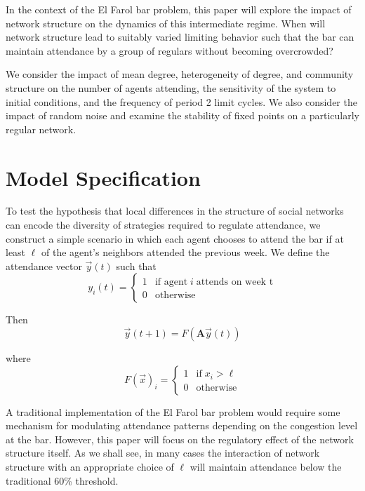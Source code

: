 \documentclass[12pt]{article}
\begin{document}
In the context of the El Farol bar problem, this paper will explore the impact of network structure on the dynamics of this intermediate regime.  When will network structure lead to suitably varied limiting behavior such that the bar can maintain attendance by a group of regulars without becoming overcrowded?  

We consider the impact of mean degree, heterogeneity of degree, and community structure on the number of agents attending, the sensitivity of the system to initial conditions, and the frequency of period 2 limit cycles.  We also consider the impact of random noise and examine the stability of fixed points on a particularly regular network.

\section{Model Specification}
To test the hypothesis that local differences in the structure of social networks can encode the diversity of strategies required to regulate attendance, we construct a simple scenario in which each agent chooses to attend the bar if at least $\ell$ of the agent's neighbors attended the previous week.  We define the attendance vector $\vec{y}(t)$ such that
\begin{equation}
  y_i(t) = \begin{cases}
    1 &\text{if agent}\; i \; \text{attends on week t} \\
    0 &\text{otherwise}
  \end{cases}
\end{equation}

Then 
\begin{equation}
  \vec{y}(t + 1) = F(\mathbf{A}\vec{y}(t))
\end{equation}

where
\begin{equation}
  F(\vec{x})_i = \begin{cases}
    1 &\text{if} \; x_i > \ell \\
    0 &\text{otherwise}
  \end{cases}
\end{equation}

A traditional implementation of the El Farol bar problem would require some mechanism for modulating attendance patterns depending on the congestion level at the bar.  However, this paper will focus on the regulatory effect of the network structure itself.  As we shall see, in many cases the interaction of network structure with an appropriate choice of $\ell$ will maintain attendance below the traditional 60\% threshold. 
\end{document}

